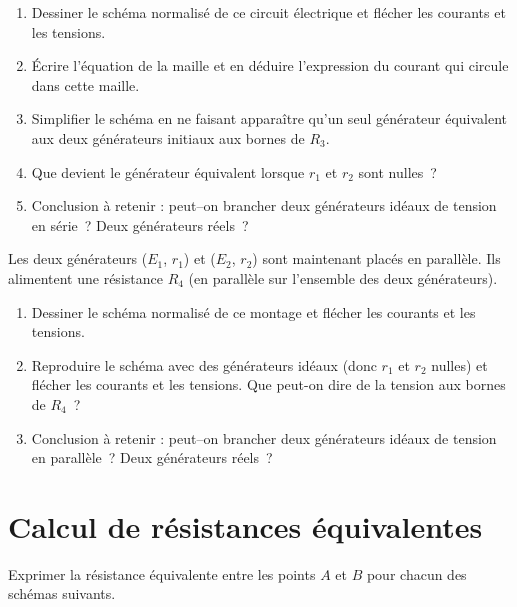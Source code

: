 \documentclass[../../main/main.tex]{subfiles}
\begin{document}
\begin{enumerate}
	\item Dessiner le schéma normalisé de ce circuit électrique et flécher les
	      courants et les tensions.
	\item Écrire l'équation de la maille et en déduire l'expression du courant
	      qui circule dans cette maille.
	\item Simplifier le schéma en ne faisant apparaître qu'un seul générateur
	      équivalent aux deux générateurs initiaux aux bornes de $R_3$.
	\item Que devient le générateur équivalent lorsque $r_1$ et $r_2$ sont
	      nulles~?
	\item Conclusion à retenir : peut–on brancher deux générateurs idéaux de
	      tension en série~? Deux générateurs réels~?
\end{enumerate}
Les deux générateurs ($E_1$, $r_1$) et ($E_2$, $r_2$) sont maintenant placés en
parallèle. Ils alimentent une résistance $R_4$ (en parallèle sur l'ensemble des
deux générateurs).
\begin{enumerate}[resume]
	\item Dessiner le schéma normalisé de ce montage et flécher les courants et
	      les tensions.
	\item Reproduire le schéma avec des générateurs idéaux (donc $r_1$ et $r_2$
	      nulles) et flécher les courants et les tensions. Que peut-on dire de la
	      tension aux bornes de $R_4$~?
	\item Conclusion à retenir : peut–on brancher deux générateurs idéaux de
	      tension en parallèle~? Deux générateurs réels~?
\end{enumerate}

\section{Calcul de résistances équivalentes}
Exprimer la résistance équivalente entre les points $A$ et $B$ pour chacun des
schémas suivants.
\bigbreak
\end{document}
